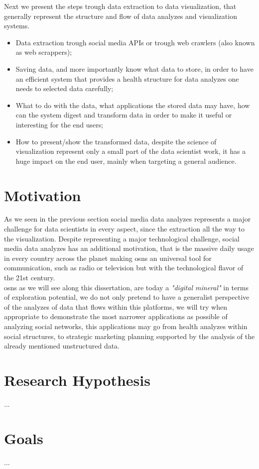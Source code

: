 Next we present the steps trough data extraction to data visualization, that generally represent the structure and flow of data analyzes and visualization systems.

\begin{itemize}
\item Data extraction trough social media APIs or trough web crawlers (also known as web scrappers);
\item Saving data, and more importantly know what data to store, in order to have an efficient system that provides a health structure for data analyzes one needs
to selected data carefully;
\item What to do with the data, what applications the stored data may have, how can the system digest and transform data in order to make it useful or interesting for the end users;
\item How to present/show the transformed data, despite the science of visualization represent only a small part of the data scientist work, it has a huge impact on the end user, mainly when targeting a general audience.
\end{itemize}

\section{Motivation}
As we seen in the previous section social media data analyzes represents a major challenge for data scientists in every aspect, since the extraction all the way to the visualization. Despite representing a major technological challenge, social media data analyzes has an additional motivation, that is the massive daily usage in every country across the planet making \glspl{osn} an universal tool for communication, such as radio or television but with the technological flavor of the 21st century.\\
\indent \glspl{osn} as we will see along this dissertation, are today a \textit{"digital mineral"} in terms of exploration potential, we do not only pretend to have a generalist perspective of the analyzes of data that flows within this platforms, we will try when appropriate to demonstrate the most narrower applications as possible of analyzing social networks, this applications may go from health analyzes within social structures, to strategic marketing planning supported by the analysis of the already mentioned unstructured data.


\section{Research Hypothesis}
...

\section{Goals}
...
